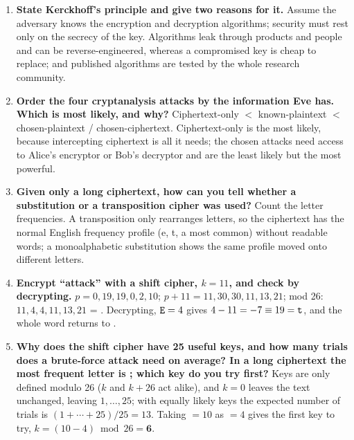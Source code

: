 \begin{enumerate}[leftmargin=1.6em,itemsep=3pt]
  \item \textbf{State Kerckhoff's principle and give two reasons for it.} Assume the adversary knows the encryption and decryption algorithms; security must rest only on the secrecy of the key. Algorithms leak through products and people and can be reverse-engineered, whereas a compromised key is cheap to replace; and published algorithms are tested by the whole research community.
  \item \textbf{Order the four cryptanalysis attacks by the information Eve has. Which is most likely, and why?} Ciphertext-only $<$ known-plaintext $<$ chosen-plaintext / chosen-ciphertext. Ciphertext-only is the most likely, because intercepting ciphertext is all it needs; the chosen attacks need access to Alice's encryptor or Bob's decryptor and are the least likely but the most powerful.
  \item \textbf{Given only a long ciphertext, how can you tell whether a substitution or a transposition cipher was used?} Count the letter frequencies. A transposition only rearranges letters, so the ciphertext has the normal English frequency profile (e, t, a most common) without readable words; a monoalphabetic substitution shows the same profile moved onto different letters.
  \item \textbf{Encrypt ``attack'' with a shift cipher, $k = 11$, and check by decrypting.} $p = 0, 19, 19, 0, 2, 10$; $p + 11 = 11, 30, 30, 11, 13, 21$; mod 26: $11, 4, 4, 11, 13, 21$ = \textbf{}. Decrypting, $\texttt{E} = 4$ gives $4 - 11 = -7 \equiv 19 = \texttt{t}$, and the whole word returns to  \checkmark.
  \item \textbf{Why does the shift cipher have 25 useful keys, and how many trials does a brute-force attack need on average? In a long ciphertext the most frequent letter is ; which key do you try first?} Keys are only defined modulo 26 ($k$ and $k + 26$ act alike), and $k = 0$ leaves the text unchanged, leaving $1, \dots, 25$; with equally likely keys the expected number of trials is $(1 + \cdots + 25)/25 = 13$. Taking  $= 10$ as  $= 4$ gives the first key to try, $k = (10 - 4) \bmod 26 = \mathbf{6}$.
\end{enumerate}
